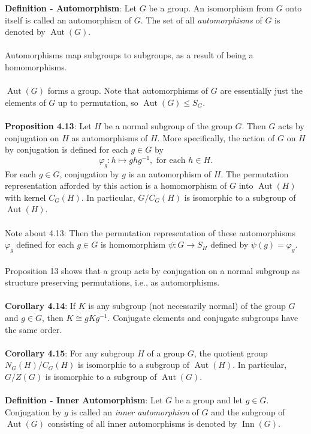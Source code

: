 \documentclass{article}
\DeclareMathOperator{\aut}{Aut}
\DeclareMathOperator{\inn}{Inn}
\begin{document}
\textbf{Definition - Automorphism}: Let $G$ be a group. An isomorphism from $G$ onto itself is called an automorphism of $G$. The set of all \textit{automorphisms} of $G$ is denoted by $\aut(G)$. \\ \\
Automorphisms map subgroups to subgroups, as a result of being a homomorphisms. \\ \\ 
$\aut(G)$ forms a group. Note that automorphisms of $G$ are essentially just the elements of $G$ up to permutation, so $\aut(G) \leq S_G$. \\ \\
\textbf{Proposition 4.13}: Let $H$ be a normal subgroup of the group $G$. Then $G$ acts by conjugation on $H$ as automorphisms of $H$. More specifically, the action of $G$ on $H$ by conjugation is defined for each $g \in G$ by $$\varphi_g: h \mapsto ghg^{-1}, \text{ for each } h \in H.$$ For each $g \in G$, conjugation by $g$ is an automorphism of $H$. The permutation representation afforded by this action is a homomorphism of $G$ into $\aut(H)$ with kernel $C_G(H)$. In particular, $G/C_G(H)$ is isomorphic to a subgroup of $\aut(H)$. \\ \\
Note about 4.13: Then the permutation representation of these automorphisms $\varphi_g$ defined for each $g \in G$ is homomorphism $\psi: G \rightarrow S_H$ defined by $\psi(g) = \varphi_g.$ \\ \\
Proposition 13 shows that a group acts by conjugation on a normal subgroup as structure preserving permutations, i.e., as automorphisms. \\ \\
\textbf{Corollary 4.14}: If $K$ is any subgroup (not necessarily normal) of the group $G$ and $g \in G$, then $K \cong gKg^{-1}$. Conjugate elements and conjugate subgroups have the same order. \\ \\
\textbf{Corollary 4.15}: For any subgroup $H$ of a group $G$, the quotient group $N_G(H)/C_G(H)$ is isomorphic to a subgroup of $\aut(H)$. In particular, $G/Z(G)$ is isomorphic to a subgroup of $\aut(G)$. \\ \\
\textbf{Definition - Inner Automorphism}: Let $G$ be a group and let $g \in G$. Conjugation by $g$ is called an \textit{inner automorphism} of $G$ and the subgroup of $\aut(G)$ consisting of all inner automorphisms is denoted by $\inn(G)$. \\ \\
\end{document}
